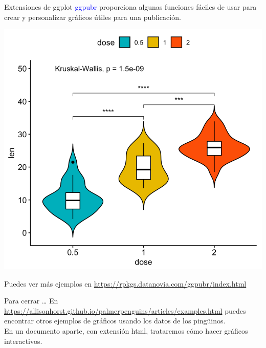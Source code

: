 \documentclass[
  ignorenonframetext,
  aspectratio=169]{beamer}
\newcommand\blue[1]{\textcolor{blue}{#1}}
\begin{document}
\begin{frame}{Extensiones de ggplot}
\protect\hypertarget{extensiones-de-ggplot-3}{}
\blue{ggpubr} proporciona algunas funciones fáciles de usar para crear y
personalizar gráficos útiles para una publicación.

\begin{center}\includegraphics[width=0.5\linewidth,height=0.5\textheight]{Imgs/violin} \end{center}

Puedes ver más ejemplos en
\url{https://rpkgs.datanovia.com/ggpubr/index.html}
\end{frame}

\begin{frame}{Para cerrar \ldots{}}
\protect\hypertarget{para-cerrar}{}
En
\url{https://allisonhorst.github.io/palmerpenguins/articles/examples.html}
puedes encontrar otros ejemplos de gráficos usando los datos de los
pingüinos.\\
En un documento aparte, con extensión html, trataremos cómo hacer
gráficos interactivos.
\end{frame}
\end{document}
